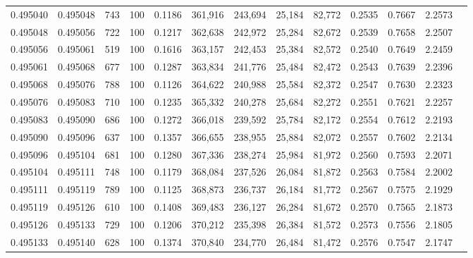 \begin{tabular}{rrrrrrrrrrrrr}
0.495040 & 0.495048 &   743 & 100 &                                     0.1186 & 361,916 & 243,694 &  25,184 &  82,772 & 0.2535 & 0.7667 & 2.2573 \\
0.495048 & 0.495056 &   722 & 100 &                                     0.1217 & 362,638 & 242,972 &  25,284 &  82,672 & 0.2539 & 0.7658 & 2.2507 \\
0.495056 & 0.495061 &   519 & 100 &                                     0.1616 & 363,157 & 242,453 &  25,384 &  82,572 & 0.2540 & 0.7649 & 2.2459 \\
0.495061 & 0.495068 &   677 & 100 &                                     0.1287 & 363,834 & 241,776 &  25,484 &  82,472 & 0.2543 & 0.7639 & 2.2396 \\
0.495068 & 0.495076 &   788 & 100 &                                     0.1126 & 364,622 & 240,988 &  25,584 &  82,372 & 0.2547 & 0.7630 & 2.2323 \\
0.495076 & 0.495083 &   710 & 100 &                                     0.1235 & 365,332 & 240,278 &  25,684 &  82,272 & 0.2551 & 0.7621 & 2.2257 \\
0.495083 & 0.495090 &   686 & 100 &                                     0.1272 & 366,018 & 239,592 &  25,784 &  82,172 & 0.2554 & 0.7612 & 2.2193 \\
0.495090 & 0.495096 &   637 & 100 &                                     0.1357 & 366,655 & 238,955 &  25,884 &  82,072 & 0.2557 & 0.7602 & 2.2134 \\
0.495096 & 0.495104 &   681 & 100 &                                     0.1280 & 367,336 & 238,274 &  25,984 &  81,972 & 0.2560 & 0.7593 & 2.2071 \\
0.495104 & 0.495111 &   748 & 100 &                                     0.1179 & 368,084 & 237,526 &  26,084 &  81,872 & 0.2563 & 0.7584 & 2.2002 \\
0.495111 & 0.495119 &   789 & 100 &                                     0.1125 & 368,873 & 236,737 &  26,184 &  81,772 & 0.2567 & 0.7575 & 2.1929 \\
0.495119 & 0.495126 &   610 & 100 &                                     0.1408 & 369,483 & 236,127 &  26,284 &  81,672 & 0.2570 & 0.7565 & 2.1873 \\
0.495126 & 0.495133 &   729 & 100 &                                     0.1206 & 370,212 & 235,398 &  26,384 &  81,572 & 0.2573 & 0.7556 & 2.1805 \\
0.495133 & 0.495140 &   628 & 100 &                                     0.1374 & 370,840 & 234,770 &  26,484 &  81,472 & 0.2576 & 0.7547 & 2.1747 \\

\end{tabular}
